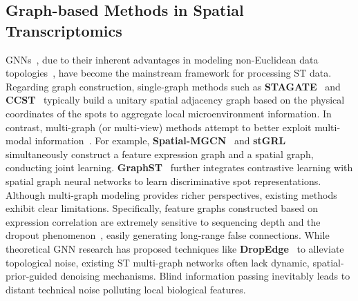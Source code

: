 \documentclass[lettersize,journal]{IEEEtran}
\begin{document}
\subsection{Graph-based Methods in Spatial Transcriptomics}
GNNs~\cite{wu2020comprehensive}, due to their inherent advantages in modeling non-Euclidean data topologies~\cite{kipf2016gcn}, have become the mainstream framework for processing ST data. Regarding graph construction, single-graph methods such as \textbf{STAGATE}~\cite{dong2022stagate} and \textbf{CCST}~\cite{li2022cell} typically build a unitary spatial adjacency graph based on the physical coordinates of the spots to aggregate local microenvironment information. In contrast, multi-graph (or multi-view) methods attempt to better exploit multi-modal information~\cite{zhang2023graphst}. For example, \textbf{Spatial-MGCN}~\cite{wang2023spatialmgcn} and \textbf{stGRL}~\cite{lu2025stgrl} simultaneously construct a feature expression graph and a spatial graph, conducting joint learning. \textbf{GraphST}~\cite{zhang2023graphst} further integrates contrastive learning with spatial graph neural networks to learn discriminative spot representations. Although multi-graph modeling provides richer perspectives, existing methods exhibit clear limitations. Specifically, feature graphs constructed based on expression correlation are extremely sensitive to sequencing depth and the dropout phenomenon~\cite{jiang2022statistics}, easily generating long-range false connections. While theoretical GNN research has proposed techniques like \textbf{DropEdge}~\cite{rong2019dropedge} to alleviate topological noise, existing ST multi-graph networks often lack dynamic, spatial-prior-guided denoising mechanisms. Blind information passing inevitably leads to distant technical noise polluting local biological features.
\end{document}
